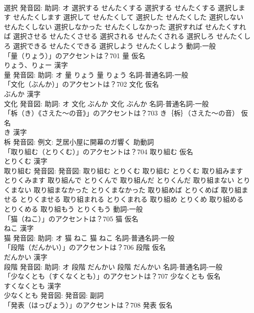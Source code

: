 \documentclass[8pt]{extreport}
\begin{document}
\begin{CJK}{UTF8}{min}
\\	選択 発音図: 助詞: オ	選択する せんたくする		選択する せんたくする 選択します せんたくします 選択して せんたくして 選択した せんたくした 選択しない せんたくしない 選択しなかった せんたくしなかった 選択すれば せんたくすれば 選択させる せんたくさせる 選択される せんたくされる 選択しろ せんたくしろ 選択できる せんたくできる 選択しよう せんたくしよう				動詞-一般 
\\	「量（りょう）」のアクセントは？701	量 仮名　
\\	りょう、りょー 漢字　
\\	量 発音図: 助詞: オ	量 りょう		量 りょう				名詞-普通名詞-一般 
\\	「文化（ぶんか）」のアクセントは？702	文化 仮名　
\\	ぶんか 漢字　
\\	文化 発音図: 助詞: オ	文化 ぶんか		文化 ぶんか				名詞-普通名詞-一般 
\\	「柝（き）《さえた〜の音》」のアクセントは？703	き｛柝｝（さえた〜の音） 仮名　
\\	き 漢字　
\\	柝 発音図: 例文: 芝居小屋に開幕のガ響く							助動詞 
\\	「取り組む（とりくむ）」のアクセントは？704	取り組む 仮名　
\\	とりくむ 漢字　
\\	取り組む 発音図: 発音図:	取り組む とりくむ		取り組む とりくむ 取り組みます とりくみます 取り組んで とりくんで 取り組んだ とりくんだ 取り組まない とりくまない 取り組まなかった とりくまなかった 取り組めば とりくめば 取り組ませる とりくませる 取り組まれる とりくまれる 取り組め とりくめ 取り組める とりくめる 取り組もう とりくもう				動詞-一般 
\\	「猫（ねこ）」のアクセントは？705	猫 仮名　
\\	ねこ 漢字　
\\	猫 発音図: 助詞: オ	猫 ねこ		猫 ねこ				名詞-普通名詞-一般 
\\	「段階（だんかい）」のアクセントは？706	段階 仮名　
\\	だんかい 漢字　
\\	段階 発音図: 助詞: オ	段階 だんかい		段階 だんかい				名詞-普通名詞-一般 
\\	「少なくとも（すくなくとも）」のアクセントは？707	少なくとも 仮名　
\\	すくなくとも 漢字　
\\	少なくとも 発音図: 発音図:							副詞 
\\	「発表（はっぴょう）」のアクセントは？708	発表 仮名　

\end{CJK}
\end{document}
